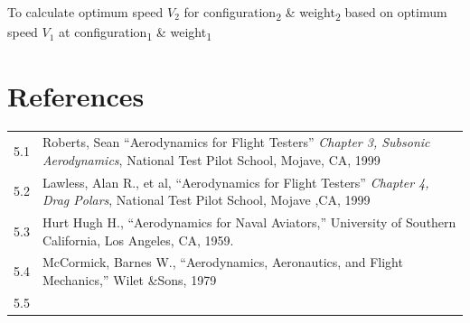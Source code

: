 \documentclass[
]{book}
\begin{document}
To calculate optimum speed \(V_2\) for configuration\textsubscript{2} \& weight\textsubscript{2} based on optimum speed \(V_1\) at configuration\textsubscript{1} \& weight\textsubscript{1}

\hypertarget{references-3}{%
\section{References}\label{references-3}}

\begin{longtable}[]{@{}ll@{}}
\toprule
\endhead
\begin{minipage}[t]{0.06\columnwidth}\raggedright
5.1\strut
\end{minipage} & \begin{minipage}[t]{0.88\columnwidth}\raggedright
Roberts, Sean ``Aerodynamics for Flight Testers'' \emph{Chapter 3, Subsonic Aerodynamics}, National Test Pilot School, Mojave, CA, 1999\strut
\end{minipage}\tabularnewline
\begin{minipage}[t]{0.06\columnwidth}\raggedright
5.2\strut
\end{minipage} & \begin{minipage}[t]{0.88\columnwidth}\raggedright
Lawless, Alan R., et al, ``Aerodynamics for Flight Testers'' \emph{Chapter 4, Drag Polars}, National Test Pilot School, Mojave ,CA, 1999\strut
\end{minipage}\tabularnewline
\begin{minipage}[t]{0.06\columnwidth}\raggedright
5.3\strut
\end{minipage} & \begin{minipage}[t]{0.88\columnwidth}\raggedright
Hurt Hugh H., ``Aerodynamics for Naval Aviators,'' University of Southern California, Los Angeles, CA, 1959.\strut
\end{minipage}\tabularnewline
\begin{minipage}[t]{0.06\columnwidth}\raggedright
5.4\strut
\end{minipage} & \begin{minipage}[t]{0.88\columnwidth}\raggedright
McCormick, Barnes W., ``Aerodynamics, Aeronautics, and Flight Mechanics,'' Wilet \&Sons, 1979\strut
\end{minipage}\tabularnewline
\begin{minipage}[t]{0.06\columnwidth}\raggedright
5.5\strut
\end{minipage} & \begin{minipage}[t]{0.88\columnwidth}\raggedright

\end{minipage}
\end{longtable}
\end{document}
